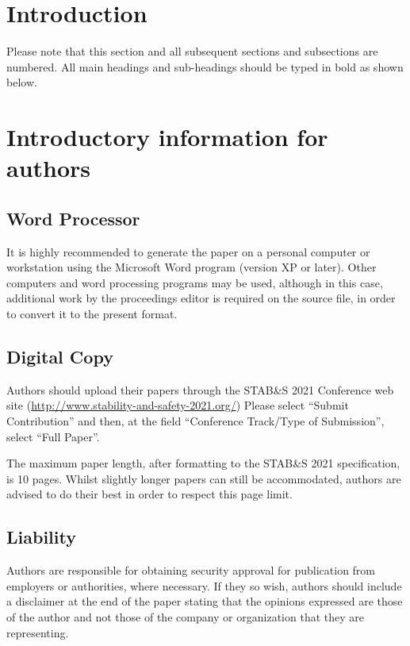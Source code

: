 \documentclass{stabs21}
\begin{document}
\begin{multicols}{2}

\section{Introduction}

Please note that this section and all subsequent sections and
subsections are numbered.  All main headings and sub-headings should
be typed in bold as shown below.

\section{Introductory information for authors}

\subsection{Word Processor}

It is highly recommended to generate the paper on a personal computer
or workstation using the Microsoft Word program (version XP or
later). Other computers and word processing programs may be used,
although in this case, additional work by the proceedings editor is
required on the source file, in order to convert it to the present
format.

\subsection{Digital Copy}

Authors should upload their papers through the STAB\&S 2021 Conference
web site (\url{http://www.stability-and-safety-2021.org/}) Please
select ``Submit Contribution'' and then, at the field ``Conference
Track/Type of Submission'', select ``Full Paper''.

The maximum paper length, after formatting to the STAB\&S 2021
specification, is 10 pages. Whilst slightly longer papers can still be
accommodated, authors are advised to do their best in order to respect
this page limit.

\subsection{Liability}

Authors are responsible for obtaining security approval for
publication from employers or authorities, where necessary. If they so
wish, authors should include a disclaimer at the end of the paper
stating that the opinions expressed are those of the author and not
those of the company or organization that they are representing.


\end{multicols}
\end{document}
